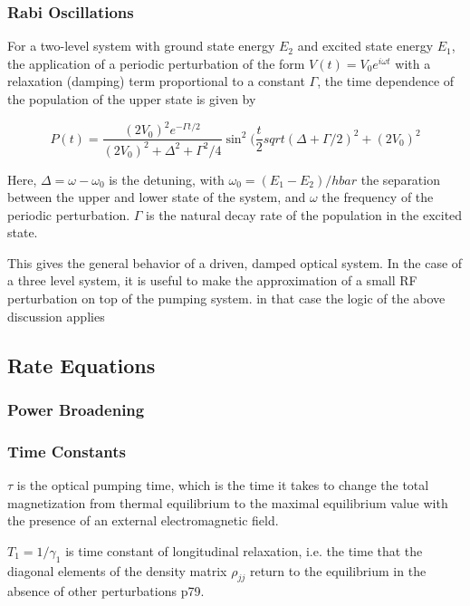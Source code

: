 \subsubsection{Rabi Oscillations}

For a two-level system with ground state energy $E_2$ and excited
state energy $E_1$, the application of a periodic perturbation of the
form $V(t) = V_0e^{i\omega t}$ with a relaxation (damping) term
proportional to a constant $\Gamma$, the time dependence of the
population of the upper state is given by

\begin{equation}
P(t) = \frac{(2V_0)^2e^{-\Gamma t/2}}{(2V_0)^2 +\Delta^2 + \Gamma^2/4}\sin^2(\frac{t}{2}sqrt{(\Delta + \Gamma/2)^2 + (2V_0)^2}
\end{equation}

Here, $\Delta = \omega - \omega_0$ is the detuning, with $\omega_0 =
(E_1 - E_2)/hbar$ the separation between the upper and lower state of
the system, and $\omega$ the frequency of the periodic
perturbation. $\Gamma$ is the natural decay rate of the population in
the excited state.

This gives the general behavior of a driven, damped optical system. In
the case of a three level system, it is useful to make the
approximation of a small RF perturbation on top of the pumping
system. in that case the logic of the above discussion applies


\subsection{Rate Equations}

\subsubsection{Power Broadening}

\subsubsection{Time Constants}

$\tau$ is the optical pumping time, which is the time it takes to
change the total magnetization from thermal equilibrium to the maximal
equilibrium value with the presence of an external electromagnetic
field.

$T_1 = 1/\gamma_1$ is time constant of longitudinal relaxation,
i.e. the time that the diagonal elements of the density matrix
$\rho_{jj}$ return to the equilibrium in the absence of other
perturbations \cite{vanier} p79.

